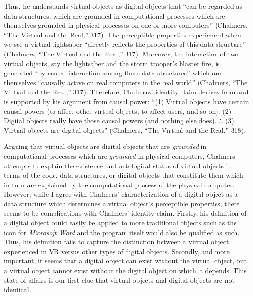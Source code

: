 \documentclass{article}
\begin{document}
Thus, he understands virtual objects as digital objects that ``can be regarded as data structures, which are grounded in computational processes which are themselves grounded in physical processes on one or more computers'' (Chalmers, ``The Virtual and the Real,'' 317). The perceptible properties experienced when we see a virtual lightsaber ``directly reflects the properties of this data structure'' (Chalmers, ``The Virtual and the Real,'' 317). Moreover, the interaction of two virtual objects, say the lightsaber and the storm trooper’s blaster fire, is generated ``by causal interaction among these data structures'' which are themselves ``causally active on real computers in the real world'' (Chalmers, ``The Virtual and the Real,'' 317). Therefore, Chalmers’ identity claim derives from and is supported by his argument from causal power: ``(1) Virtual objects have certain causal powers (to affect other virtual objects, to affect users, and so on). (2) Digital objects really have those causal powers (and nothing else does). ∴ (3) Virtual objects are digital objects'' (Chalmers, ``The Virtual and the Real,'' 318).

Arguing that virtual objects are digital objects that are \textit{grounded} in computational processes which are \textit{grounded} in physical computers, Chalmers attempts to explain the existence and ontological status of virtual objects in terms of the code, data structures, or digital objects that constitute them which in turn are explained by the computational process of the physical computer. However, while I agree with Chalmers’ characterization of a digital object as a data structure which determines a virtual object’s perceptible properties, there seems to be complications with Chalmers’ identity claim. Firstly, his definition of a digital object could easily be applied to more traditional objects such as the icon for \textit{Microsoft Word} and the program itself would also be qualified as such. Thus, his definition fails to capture the distinction between a virtual object experienced in VR versus other types of digital objects. Secondly, and more important, it seems that a digital object can exist without the virtual object, but a virtual object cannot exist without the digital object on which it depends. This state of affairs is our first clue that virtual objects and digital objects are not identical.
\end{document}

